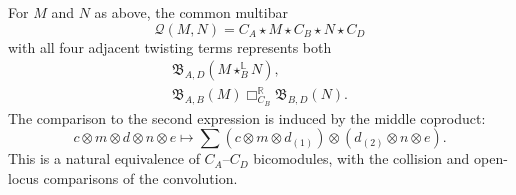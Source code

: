 \begin{theorem}\label{ogd:thm:bimodule-composition}
For \(M\) and \(N\) as above, the common multibar
\begin{equation}\label{ogd:eq:common-multibar}
 \mathcal Q(M,N)=C_A\star M\star C_B\star N\star C_D
\end{equation}
with all four adjacent twisting terms represents both
\begin{gather*}
 \mathfrak B_{A,D}(M\star_B^{\mathbb L}N),\\
 \mathfrak B_{A,B}(M)\mathbin{\Box}^{\mathbb R}_{C_B}
                   \mathfrak B_{B,D}(N).
\end{gather*}
The comparison to the second expression is induced by the middle coproduct:
\begin{equation}\label{ogd:eq:middle-coproduct}
 c\otimes m\otimes d\otimes n\otimes e
 \longmapsto
 \sum(c\otimes m\otimes d_{(1)})\otimes
          (d_{(2)}\otimes n\otimes e).
\end{equation}
This is a natural equivalence of \(C_A\)--\(C_D\) bicomodules, with the collision and open-locus comparisons of the convolution.
\end{theorem}
